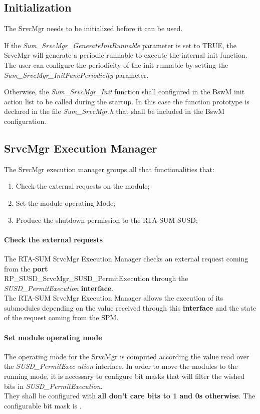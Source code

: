 \subsection{Initialization}
\label{subsec:initialization}
The SrvcMgr needs to be initialized before it can be used. 

If the \textit{Sum\_SrvcMgr\_GenerateInitRunnable} parameter is set to TRUE, the SrvcMgr will generate a periodic runnable to execute the internal init function. 
The user can configure the periodicity of the init runnable by setting the \textit{Sum\_SrvcMgr\_InitFuncPeriodicity} parameter. 


Otherwise, the \textit{Sum\_SrvcMgr\_Init} function shall configured in the BswM init action list to be called during the startup. 
In this case the function prototype is declared in the file \textit{Sum\_SrvcMgr.h} that shall be included in the BswM configuration.


\subsection{SrvcMgr Execution Manager}
\label{subsec:executionmask}
The SrvcMgr execution manager groups all that functionalities that:

\begin{enumerate}
    \item Check the external requests on the module;
    \item Set the module operating Mode;
    \item Produce the shutdown permission to the RTA-SUM SUSD; 
\end{enumerate}

\paragraph{Check the external requests}
The RTA-SUM SrvcMgr Execution Manager checks an external request coming from the \textbf{port}
\\RP\_SUSD\_SrvcMgr\_SUSD\_PermitExecution through the \textit{SUSD\_PermitExecution} \textbf{interface}.
\\The RTA-SUM SrvcMgr Execution Manager allows the execution of its submodules depending on the value received through this \textbf{interface} and the state of the request coming from the SPM.

\paragraph{Set module operating mode} The operating mode for the SrvcMgr is computed according the value read over the \textit{SUSD\_PermitExec ution} interface.
In order to move the modules to the running mode, it is necessary to configure bit masks that will filter the wished bits in \textit{SUSD\_PermitExecution}.\\
They shall be configured with \textbf{all don't care bits to 1 and 0s otherwise}.
The configurable bit mask is .

